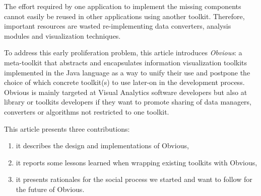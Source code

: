 The effort required by one application to implement the missing
components cannot easily be reused in other applications using another
toolkit.  Therefore, important resources are wasted re-implementing
data converters, analysis modules and visualization techniques. 

To address this early proliferation problem, this article
introduces \emph{Obvious}: a meta-toolkit that abstracts and
encapsulates information visualization toolkits implemented in the
Java language as a way to unify their use and postpone the choice of
which concrete toolkit(s) to use later-on in the development process.
Obvious is mainly targeted at Visual Analytics software developers but
also at library or toolkits developers if they want to promote sharing
of data managers, converters or algorithms not restricted to one
toolkit.

This article presents three contributions:
\begin{enumerate}
\item it describes the design and implementations of Obvious,
\item it reports some lessons learned when wrapping existing toolkits
  with Obvious,
\item it presents rationales for the social process we started and
  want to follow for the future of Obvious.
\end{enumerate}

